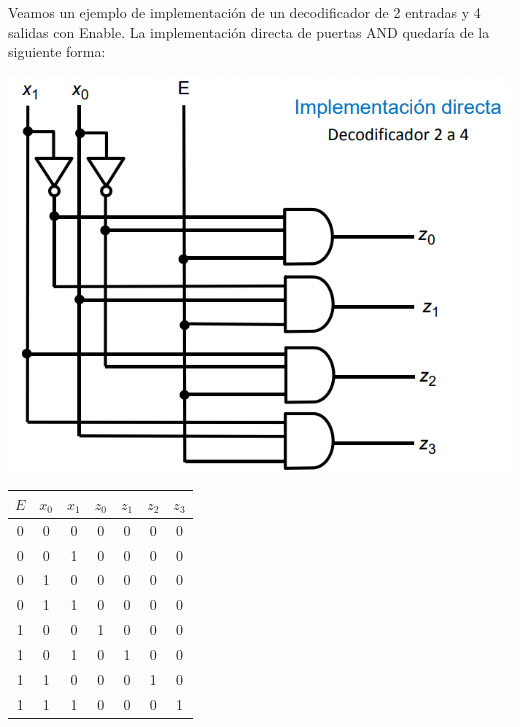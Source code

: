 \documentclass[a4paper,10pt]{book}
\begin{document}
Veamos un ejemplo de implementación de un decodificador de 2 entradas y 4 salidas con Enable. La implementación directa de puertas AND quedaría de la siguiente forma:
\begin{multicols}{2}
\begin{center}
\includegraphics[scale=0.45]{deco2}
\end{center}

\begin{center}
\begin{tabular}{|c|c|c|c|c|c|c|}
\hline
$E$ & $x_0$ & $x_1$ & $z_0$ & $z_1$ & $z_2$ & $z_3$ \\
\hline
0 & 0 & 0 & 0 & 0 & 0 & 0 \\
\hline
0 & 0 & 1 & 0 & 0 & 0 & 0 \\
\hline
0 & 1 & 0 & 0 & 0 & 0 & 0 \\
\hline
0 & 1 & 1 & 0 & 0 & 0 & 0 \\
\hline
1 & 0 & 0 & 1 & 0 & 0 & 0 \\
\hline
1 & 0 & 1 & 0 & 1 & 0 & 0 \\
\hline
1 & 1 & 0 & 0 & 0 & 1 & 0 \\
\hline
1 & 1 & 1 & 0 & 0 & 0 & 1 \\
\hline
\end{tabular}
\end{center}
\end{multicols}
\end{document}
